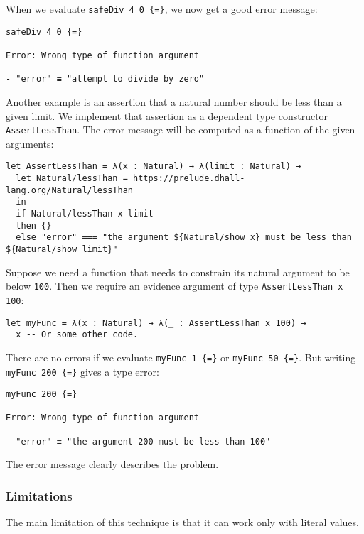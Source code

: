 When we evaluate \lstinline!safeDiv 4 0 {=}!, we now get a good error message:


\begin{lstlisting}
safeDiv 4 0 {=}

Error: Wrong type of function argument

- "error" ≡ "attempt to divide by zero"
\end{lstlisting}


Another example is an assertion that a natural number should be less than a given limit.
We implement that assertion as a dependent type constructor \lstinline!AssertLessThan!.
The error message will be computed as a function of the given arguments:


\begin{lstlisting}[language=Dhall]
let AssertLessThan = λ(x : Natural) → λ(limit : Natural) →
  let Natural/lessThan = https://prelude.dhall-lang.org/Natural/lessThan
  in
  if Natural/lessThan x limit
  then {}
  else "error" === "the argument ${Natural/show x} must be less than ${Natural/show limit}"
\end{lstlisting}


Suppose we need a function that needs to constrain its natural argument to be below \lstinline!100!.
Then we require an evidence argument of type \lstinline!AssertLessThan x 100!:


\begin{lstlisting}[language=Dhall]
let myFunc = λ(x : Natural) → λ(_ : AssertLessThan x 100) →
  x -- Or some other code.
\end{lstlisting}


There are no errors if we evaluate \lstinline!myFunc 1 {=}! or \lstinline!myFunc 50 {=}!.
But writing \lstinline!myFunc 200 {=}! gives a type error:


\begin{lstlisting}
myFunc 200 {=}

Error: Wrong type of function argument

- "error" ≡ "the argument 200 must be less than 100"
\end{lstlisting}


The error message clearly describes the problem.


\subsubsection{Limitations}


The main limitation of this technique is that it can work only with literal values.


